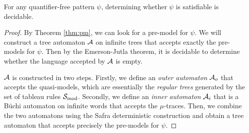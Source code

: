 \begin{theorem}\label{thm:qf-decidable}
For any quantifier-free pattern $\psi$, determining whether $\psi$ is 
satisfiable is decidable.
\end{theorem}
\begin{proof}
By Theorem \ref{thm:pm}, we can look for a pre-model for $\psi$.
We will construct a tree automaton $\mathcal{A}$ on infinite trees that accepts 
exactly the pre-models for $\psi$.
Then by the Emerson-Jutla theorem, it is decidable to determine whether the 
language accepted by $\mathcal{A}$ is empty. 

$\mathcal{A}$ is constructed in two steps. Firstly, we define an \emph{outer automaton}
$\mathcal{A}_o$ that accepts the quasi-models, which are essentially the \emph{regular 
trees} generated by the set of tableau rules $\mathcal{S}_\mathrm{mod}$.
Secondly, we define an \emph{inner automaton} $\mathcal{A}_i$ that is a B\"uchi 
automaton on infinite words that accepts the $\mu$-traces.
Then, we combine the two automatons using the Safra deterministic construction
and obtain a tree automaton that accepts precisely the pre-models for $\psi$.
\end{proof}

